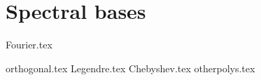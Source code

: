 \chapter{Spectral bases}

{Fourier.tex}

{orthogonal.tex}
{Legendre.tex}
{Chebyshev.tex}
{otherpolys.tex}







\printbibliography[heading=subbibliography]
